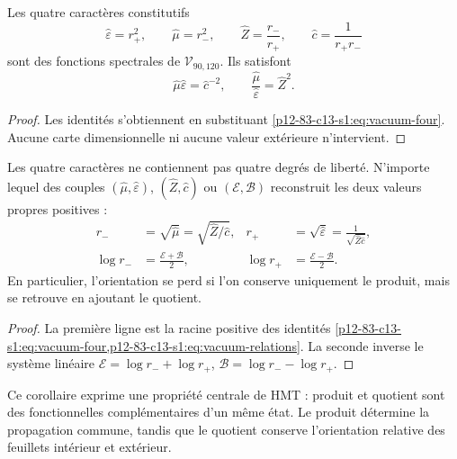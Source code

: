 \begin{theorem}
Les quatre caractères constitutifs
\begin{equation}
\widehat\varepsilon=r_+^2,\qquad
\widehat\mu=r_-^2,\qquad
\widehat Z=\frac{r_-}{r_+},\qquad
\widehat c=\frac1{r_+r_-}
\label{p12-83-c13-s1:eq:vacuum-four}
\end{equation}
sont des fonctions spectrales de \(\mathcal V_{90,120}\). Ils satisfont
\begin{equation}
\widehat\mu\widehat\varepsilon=\widehat c^{-2},
\qquad
\frac{\widehat\mu}{\widehat\varepsilon}=\widehat Z^2.
\label{p12-83-c13-s1:eq:vacuum-relations}
\end{equation}
\end{theorem}

\begin{proof}
Les identités s'obtiennent en substituant \cref{p12-83-c13-s1:eq:vacuum-four}. Aucune carte dimensionnelle ni aucune valeur extérieure n'intervient.
\end{proof}

\begin{corollary}
Les quatre caractères ne contiennent pas quatre degrés de liberté. N'importe lequel
des couples \((\widehat\mu,\widehat\varepsilon)\),
\((\widehat Z,\widehat c)\) ou \((\mathcal E,\mathcal B)\) reconstruit les
deux valeurs propres positives :
\begin{align}
r_-&=\sqrt{\widehat\mu}
=\sqrt{\widehat Z/\widehat c},
&r_+&=\sqrt{\widehat\varepsilon}
=\frac1{\sqrt{\widehat Z\widehat c}},
\label{p12-83-c13-s1:eq:vacuum-reconstruct-r}\\
\log r_-&=\frac{\mathcal E+\mathcal B}{2},
&\log r_+&=\frac{\mathcal E-\mathcal B}{2}.
\label{p12-83-c13-s1:eq:vacuum-reconstruct-log}
\end{align}
En particulier, l'orientation se perd si l'on conserve uniquement le produit,
mais se retrouve en ajoutant le quotient.
\end{corollary}

\begin{proof}
La première ligne est la racine positive des identités
\cref{p12-83-c13-s1:eq:vacuum-four,p12-83-c13-s1:eq:vacuum-relations}. La seconde inverse le système
linéaire
\(\mathcal E=\log r_-+\log r_+\),
\(\mathcal B=\log r_--\log r_+\).
\end{proof}

Ce corollaire exprime une propriété centrale de HMT : produit et quotient sont
des fonctionnelles complémentaires d'un même état. Le produit détermine la
propagation commune, tandis que le quotient conserve l'orientation
relative des feuillets intérieur et extérieur.

